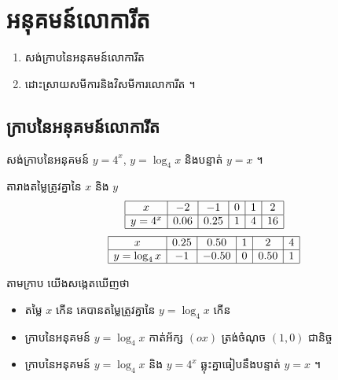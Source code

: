 \chapter{អនុគមន៍លោការីត}

\begin{objBox}[វត្ថុបំណង]
\begin{enumerate}[1]
  \item សង់ក្រាបនៃអនុគមន៍លោការីត
  \item ដោះស្រាយសមីការនិងវិសមីការលោការីត ។
\end{enumerate}
\end{objBox}

\section{ក្រាបនៃអនុគមន៍លោការីត}

\begin{example}[ឧទាហរណ៍ ក]
សង់ក្រាបនៃអនុគមន៍ $y = 4^x$, $y = \log_4 x$ និងបន្ទាត់ $y = x$ ។

តារាងតម្លៃត្រូវគ្នានៃ $x$ និង $y$
\[
\begin{array}{|c|c|c|c|c|c|}\hline
x & -2 & -1 & 0 & 1 & 2\\ \hline
y = 4^x & 0.06 & 0.25 & 1 & 4 & 16\\ \hline
\end{array}
\]
\[
\begin{array}{|c|c|c|c|c|c|}\hline
x & 0.25 & 0.50 & 1 & 2 & 4\\ \hline
y = \log_4 x & -1 & -0.50 & 0 & 0.50 & 1\\ \hline
\end{array}
\]
\begin{center}
\end{center}
តាមក្រាប យើងសង្កេតឃើញថា
\begin{itemize}
  \item តម្លៃ $x$ កើន គេបានតម្លៃត្រូវគ្នានៃ $y = \log_4 x$ កើន
  \item ក្រាបនៃអនុគមន៍ $y = \log_4 x$ កាត់អ័ក្ស $(ox)$ ត្រង់ចំណុច $(1, 0)$ ជានិច្ច
  \item ក្រាបនៃអនុគមន៍ $y = \log_4 x$ និង $y = 4^x$ ឆ្លុះគ្នាធៀបនឹងបន្ទាត់ $y = x$ ។
\end{itemize}
\end{example}

